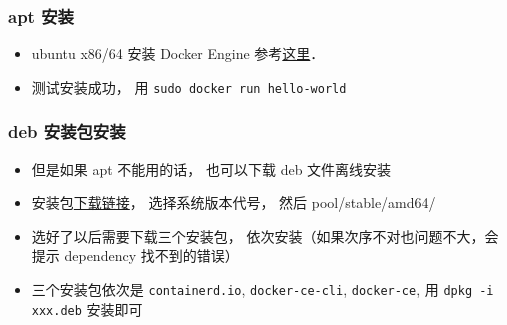 
\begin{issues}
\issueDraft
\end{issues}

\subsubsection{apt 安装}
\begin{itemize}
\item ubuntu x86/64 安装 Docker Engine 参考\href{https://docs.docker.com/install/linux/docker-ce/ubuntu/}{这里}．
\item 测试安装成功， 用 \verb`sudo docker run hello-world`
\end{itemize}

\subsubsection{deb 安装包安装}
\begin{itemize}
\item 但是如果 apt 不能用的话， 也可以下载 deb 文件离线安装
\item 安装包\href{https://download.docker.com/linux/ubuntu/dists/}{下载链接}， 选择系统版本代号， 然后 pool/stable/amd64/
\item 选好了以后需要下载三个安装包， 依次安装（如果次序不对也问题不大，会提示 dependency 找不到的错误）
\item 三个安装包依次是 \verb|containerd.io|, \verb|docker-ce-cli|, \verb|docker-ce|, 用 \verb`dpkg -i xxx.deb` 安装即可
\end{itemize}

